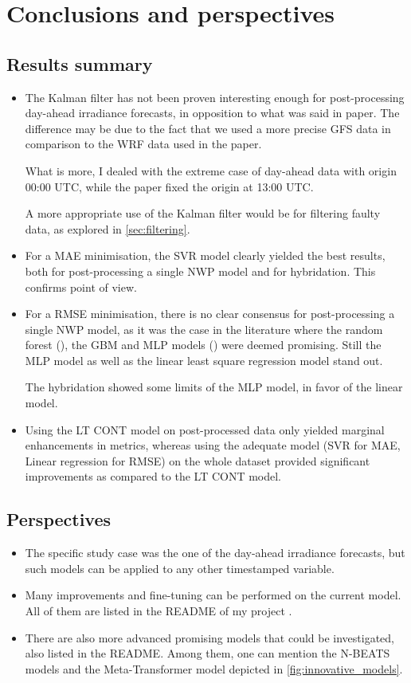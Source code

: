 \section{Conclusions and perspectives}
\subsection{Results summary}
\begin{itemize}
    \item The Kalman filter has not been proven interesting enough for post-processing day-ahead irradiance forecasts, in opposition to what was said in \cite{suksamosorn_post-processing_2021} paper. The difference may be due to the fact that we used a more precise GFS data in comparison to the WRF data used in the paper. 
    
    What is more, I dealed with the extreme case of day-ahead data with origin 00:00 UTC, while the paper fixed the origin at 13:00 UTC.

    A more appropriate use of the Kalman filter would be for filtering faulty data, as explored in \autoref{sec:filtering}.
    \item For a MAE minimisation, the SVR model clearly yielded the best results, both for post-processing a single NWP model and for hybridation. This confirms \cite{verbois_statistical_2022} point of view.
    \item For a RMSE minimisation, there is no clear consensus for post-processing a single NWP model, as it was the case in the literature where the random forest (\cite{suksamosorn_post-processing_2021}), the GBM and MLP models (\cite{verbois_statistical_2022}) were deemed promising. Still the MLP model as well as the linear least square regression model stand out.

    The hybridation showed some limits of the MLP model, in favor of the linear model.
    \item Using the LT CONT model on post-processed data only yielded marginal enhancements in metrics, whereas using the adequate model (SVR for MAE, Linear regression for RMSE) on the whole dataset provided significant improvements as compared to the LT CONT model.
\end{itemize}

\subsection{Perspectives}
\begin{itemize}
    \item The specific study case was the one of the day-ahead irradiance forecasts, but such models can be applied to any other timestamped variable.
    \item Many improvements and fine-tuning can be performed on the current model. All of them are listed in the README of my project \cite{myrepo}.
    \item There are also more advanced promising models that could be investigated, also listed in the README. Among them, one can mention the N-BEATS models and the Meta-Transformer model depicted in \autoref{fig:innovative_models}.
\end{itemize}

